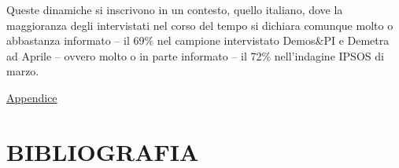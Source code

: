 \documentclass[
]{book}
\begin{document}
Queste dinamiche si inscrivono in un contesto, quello italiano, dove la maggioranza degli intervistati nel corso del tempo si dichiara comunque molto o abbastanza informato -- il 69\% nel campione intervistato Demos\&PI e Demetra ad Aprile -- ovvero molto o in parte informato -- il 72\% nell'indagine IPSOS di marzo.

\href{https://github.com/LucianaFazio/Ucrania/blob/main/PDF_Appendice/VIII.\%20Ruolo\%20dei\%20media.pdf}{Appendice}

\hypertarget{bibliografia}{%
\chapter*{BIBLIOGRAFIA}\label{bibliografia}}

  
\end{document}
